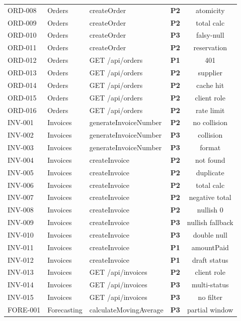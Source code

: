 ﻿\documentclass[12pt,a4paper]{report}
\newcommand{\pone}{\textbf{\color{p1red}P1}}
\newcommand{\ptwo}{\textbf{\color{p2orange}P2}}
\newcommand{\pthree}{\textbf{\color{p3blue}P3}}
\begin{document}
\begin{center}
\begin{longtable}{llllc}
  ORD-008  & Orders & createOrder & \ptwo & atomicity \\
  ORD-009  & Orders & createOrder & \ptwo & total calc \\
  ORD-010  & Orders & createOrder & \pthree & falsy-null \\
  ORD-011  & Orders & createOrder & \ptwo & reservation \\
  ORD-012  & Orders & GET /api/orders & \pone & 401 \\
  ORD-013  & Orders & GET /api/orders & \ptwo & supplier \\
  ORD-014  & Orders & GET /api/orders & \ptwo & cache hit \\
  ORD-015  & Orders & GET /api/orders & \ptwo & client role \\
  ORD-016  & Orders & GET /api/orders & \ptwo & rate limit \\
  INV-001  & Invoices & generateInvoiceNumber & \ptwo & no collision \\
  INV-002  & Invoices & generateInvoiceNumber & \pthree & collision \\
  INV-003  & Invoices & generateInvoiceNumber & \pthree & format \\
  INV-004  & Invoices & createInvoice & \ptwo & not found \\
  INV-005  & Invoices & createInvoice & \ptwo & duplicate \\
  INV-006  & Invoices & createInvoice & \ptwo & total calc \\
  INV-007  & Invoices & createInvoice & \ptwo & negative total \\
  INV-008  & Invoices & createInvoice & \ptwo & nullish 0 \\
  INV-009  & Invoices & createInvoice & \pthree & nullish fallback \\
  INV-010  & Invoices & createInvoice & \pthree & double null \\
  INV-011  & Invoices & createInvoice & \pone & amountPaid \\
  INV-012  & Invoices & createInvoice & \pone & draft status \\
  INV-013  & Invoices & GET /api/invoices & \ptwo & client role \\
  INV-014  & Invoices & GET /api/invoices & \pthree & multi-status \\
  INV-015  & Invoices & GET /api/invoices & \pthree & no filter \\
  FORE-001 & Forecasting & calculateMovingAverage & \pthree & partial window \\

\end{longtable}
\end{center}
\end{document}

